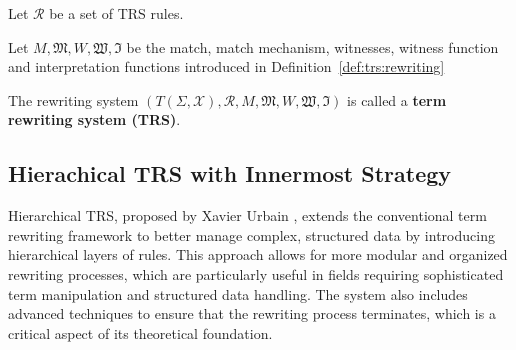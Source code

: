   \begin{definition}
    Let $\mathcal{R}$ be a set of TRS rules. 

    Let $M, \mathfrak{M}, W , \mathfrak{W}, \mathfrak{I}$ be the match, match mechanism, witnesses, witness function and interpretation functions introduced in Definition~\ref{def:trs:rewriting}
 
    The rewriting system $(T(\Sigma,\mathcal{X}), \mathcal{R}, M, \mathfrak{M}, W, \mathfrak{W}, \mathfrak{I})$ is called a \textbf{term rewriting system (TRS)}.
  \end{definition}



  \subsection{Hierachical TRS with Innermost Strategy}
  Hierarchical TRS, proposed by Xavier Urbain \cite{urbain2001approche}, extends the conventional term rewriting framework to better manage complex, structured data by introducing hierarchical layers of rules. This approach allows for more modular and organized rewriting processes, which are particularly useful in fields requiring sophisticated term manipulation and structured data handling. The system also includes advanced techniques to ensure that the rewriting process terminates, which is a critical aspect of its theoretical foundation.
  
